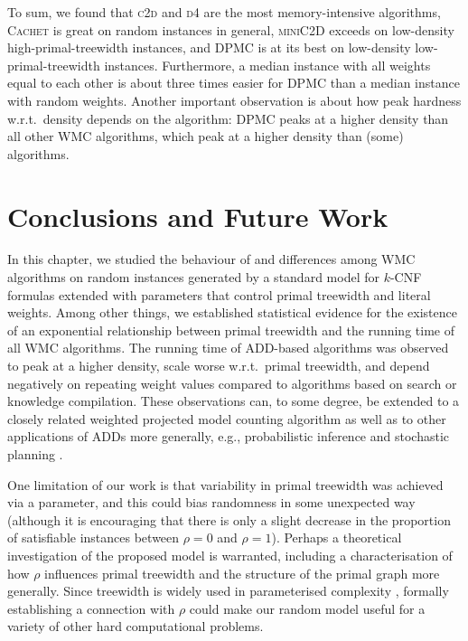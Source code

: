 To sum, we found that \textsc{c2d} and \textsc{d4} are the most memory-intensive
algorithms, \textsc{Cachet} is great on random instances in general,
\textsc{miniC2D} exceeds on low-density high-primal-treewidth instances, and
\textsc{DPMC} is at its best on low-density low-primal-treewidth instances.
Furthermore, a median instance with all weights equal to each other is about
three times easier for \textsc{DPMC} than a median instance with random weights.
Another important observation is about how peak hardness w.r.t.\ density depends
on the algorithm: \textsc{DPMC} peaks at a higher density than all other WMC
algorithms, which peak at a higher density than (some) \mc{} algorithms.

\section{Conclusions and Future Work}

In this chapter, we studied the behaviour of and differences among WMC
algorithms on random instances generated by a standard model for $k$-CNF
formulas extended with parameters that control primal treewidth and literal
weights. Among other things, we established statistical evidence for the
existence of an exponential relationship between primal treewidth and the
running time of all WMC algorithms. The running time of ADD-based algorithms was
observed to peak at a higher density, scale worse w.r.t.\ primal treewidth, and
depend negatively on repeating weight values compared to algorithms based on
search or knowledge compilation. These observations can, to some degree, be
extended to a closely related weighted projected model counting algorithm
\citep{DBLP:conf/sat/DudekPV21} as well as to other applications of ADDs more
generally, e.g., probabilistic inference
\citep{DBLP:conf/ijcai/ChaviraD07,DBLP:conf/uai/GogateD11} and stochastic
planning \citep{DBLP:conf/uai/HoeySHB99}.

One limitation of our work is that variability in primal treewidth was achieved
via a parameter, and this could bias randomness in some unexpected way (although
it is encouraging that there is only a slight decrease in the proportion of
satisfiable instances between $\rho=0$ and $\rho = 1$). Perhaps a theoretical
investigation of the proposed model is warranted, including a characterisation
of how $\rho$ influences primal treewidth and the structure of the primal graph
more generally. Since treewidth is widely used in parameterised complexity
\citep{DBLP:series/txcs/DowneyF13}, formally establishing a connection with
$\rho$ could make our random model useful for a variety of other hard
computational problems.

